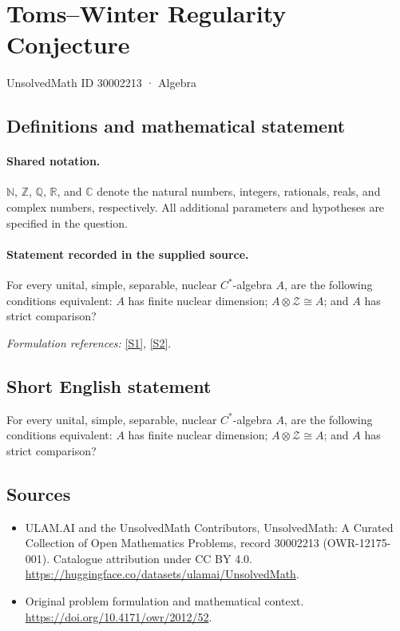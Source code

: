 \documentclass[11pt]{article}
\newcommand{\sref}[2]{\hyperlink{source:#1:#2}{[S#2]}}
\begin{document}
\setcounter{section}{30002212}
\section{Toms–Winter Regularity Conjecture}\label{30002213}
{\small UnsolvedMath ID 30002213 · Algebra}
\subsection{Definitions and mathematical statement}

\paragraph{Shared notation.}$\mathbb N$, $\mathbb Z$, $\mathbb Q$, $\mathbb R$, and $\mathbb C$ denote the natural numbers, integers, rationals, reals, and complex numbers, respectively. All additional parameters and hypotheses are specified in the question.


\paragraph{Statement recorded in the supplied source.}
For every unital, simple, separable, nuclear $C^*$-algebra $A$, are the following conditions equivalent: $A$ has finite nuclear dimension; $A\otimes\mathcal Z\cong A$; and $A$ has strict comparison?
\par\smallskip\textit{Formulation references:} \sref{30002213}{1}, \sref{30002213}{2}.
\subsection{Short English statement}
For every unital, simple, separable, nuclear $C^*$-algebra $A$, are the following conditions equivalent: $A$ has finite nuclear dimension; $A\otimes\mathcal Z\cong A$; and $A$ has strict comparison?
\subsection{Sources}
\begin{itemize}
\item[\hypertarget{source:30002213:1}{S1}] ULAM.AI and the UnsolvedMath Contributors, UnsolvedMath: A Curated Collection of Open Mathematics Problems, record 30002213 (OWR-12175-001). Catalogue attribution under CC BY 4.0.
\url{https://huggingface.co/datasets/ulamai/UnsolvedMath}.
\item[\hypertarget{source:30002213:2}{S2}] Original problem formulation and mathematical context.
\url{https://doi.org/10.4171/owr/2012/52}.
\end{itemize}
\label{end:30002213}
\end{document}
